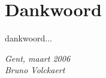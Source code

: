 \documentclass[10pt,a4paper,twoside,dutch,english]{book}                %
\begin{document}

\frontmatter
\chapter{Dankwoord}
\vspace{0.35in}

dankwoord...

\begin{flushright}{\emph{Gent, maart 2006\\
Bruno Volckaert}}
\end{flushright}

\clearpage{\pagestyle{empty}\cleardoublepage}


\renewcommand{\contentsname}{Table of Contents} %

\tableofcontents
\clearpage{\pagestyle{empty}\cleardoublepage}

\listoffigures
\clearpage{\pagestyle{empty}\cleardoublepage}

\listoftables
\clearpage{\pagestyle{empty}\cleardoublepage}



\clearpage      %
\thispagestyle{empty}   %
\mbox{}         %
\clearpage{\pagestyle{empty}\cleardoublepage}   %


\renewcommand{\bibname}{References}     %




\mainmatter     %
\renewcommand*{\thesection}{\thechapter.\arabic{section}}

\newcommand\fdtsvrightmarktmp{{\scshape\small Chapter }}
\renewcommand\evenpagerightmark{{\scshape\small\chaptername\ \thechapter}}
\renewcommand\oddpageleftmark{{\scshape\small\leftmark}}
\end{document}
